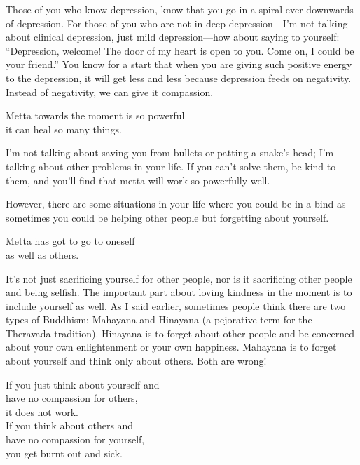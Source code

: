 \documentclass[12pt, openany]{book}
\newenvironment{aphorism}%
{%
\begin{center}\begin{itshape}
}%
{\end{itshape}\end{center}
}%
\begin{document}
Those of you who know depression, know that you go in a spiral ever downwards of depression. For those of you who are not in deep depression—I’m not talking about clinical depression, just mild depression—how about saying to yourself: “Depression, welcome! The door of my heart is open to you. Come on, I could be your friend.” You know for a start that when you are giving such positive energy to the depression, it will get less and less because depression feeds on negativity. Instead of negativity, we can give it compassion. 

\begin{aphorism}
Metta towards the moment is so powerful\\  
it can heal so many things.
\end{aphorism}

I’m not talking about saving you from bullets or patting a snake’s head; I’m talking about other problems in your life. If you can’t solve them, be kind to them, and you’ll find that metta will work so powerfully well. 

However, there are some situations in your life where you could be in a bind as sometimes you could be helping other people but forgetting about yourself. 

\begin{aphorism}
Metta has got to go to oneself\\  
as well as others.
\end{aphorism}

It’s not just sacrificing yourself for other people, nor is it sacrificing other people and being selfish. The important part about loving kindness in the moment is to include yourself as well. As I said earlier, sometimes people think there are two types of Buddhism: Mahayana and Hinayana (a pejorative term for the Theravada tradition). Hinayana is to forget about other people and be concerned about your own enlightenment or your own happiness. Mahayana is to forget about yourself and think only about others. Both are wrong! 

\begin{aphorism}
If you just think about yourself and\\  
have no compassion for others,\\ 
it does not work.\\  
If you think about others and\\ 
have no compassion for yourself,\\  
you get burnt out and sick.
\end{aphorism}
\end{document}
